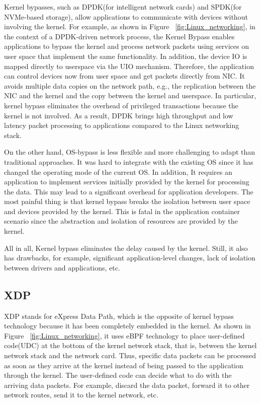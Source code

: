 Kernel bypasses, such as DPDK(for intelligent network cards) and SPDK(for NVMe-based storage), 
allow applications to communicate with devices without involving the kernel. For example, as shown in Figure ~\ref{fig:Linux_networking}, 
in the context of a DPDK-driven network process, the Kernel Bypass enables applications to bypass the kernel 
and process network packets using services on user space that implement the same functionality. In addition, 
the device IO is mapped directly to userspace via the UIO mechanism. Therefore, the application can control 
devices now from user space and get packets directly from NIC. It avoids multiple data copies on the network 
path, e.g., the replication between the NIC and the kernel and the copy between the kernel and userspace. 
In particular, kernel bypass eliminates the overhead of privileged transactions because the kernel is not 
involved. As a result, DPDK brings high throughput and low latency packet processing to applications 
compared to the Linux networking stack.

On the other hand, OS-bypass is less flexible and more challenging to adapt than traditional approaches. 
It was hard to integrate with the existing OS since it has changed the operating mode of the current OS. 
In addition, It requires an application to implement services initially provided by the kernel for processing 
the data.   This may lead to a significant overhead for application developers.  The most painful thing is 
that kernel bypass breaks the isolation between user space and devices provided by the kernel. This is fatal 
in the application container scenario since the abstraction and isolation of resources are provided by the kernel. 

All in all, Kernel bypass eliminates the delay caused by the kernel. 
Still, it also has drawbacks, for example, significant application-level changes, 
lack of isolation between drivers and applications, etc.

\subsection{XDP}
XDP stands for eXpress Data Path, which is the opposite of kernel bypass technology because 
it has been completely embedded in the kernel. As shown in Figure ~\ref{fig:Linux_networking}, it uses eBPF technology to place user-defined code(UDC) 
at the bottom of the kernel network stack, that is, between the kernel network stack and the network card. 
Thus, specific data packets can be processed as soon as they arrive at the kernel instead of being passed to 
the application through the kernel. The user-defined code can decide what to do with the arriving data packets. 
For example, discard the data packet, forward it to other network routes, send it to the kernel network, etc.

